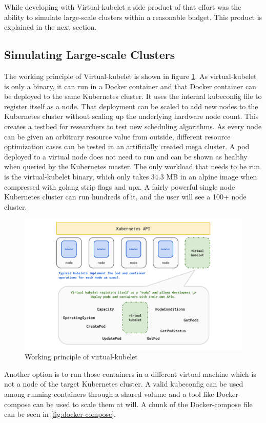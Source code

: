 While developing with Virtual-kubelet a side product of that effort was the ability to simulate large-scale clusters within a reasonable budget. This product is explained in the next section.
\subsection{Simulating Large-scale Clusters}
The working principle of Virtual-kubelet is shown in figure \ref{fig:vk}. As virtual-kubelet is only a binary, it can run in a Docker container and that Docker container can be deployed to the same Kubernetes cluster. It uses the internal kubeconfig file to register itself as a node. That deployment can be scaled to add new nodes to the Kubernetes cluster without scaling up the underlying hardware node count. This creates a testbed for researchers to test new scheduling algorithms. As every node can be given an arbitrary resource value from outside, different resource optimization cases can be tested in an artificially created mega cluster. A pod deployed to a virtual node does not need to run and can be shown as healthy when queried by the Kubernetes master. The only workload that needs to be run is the virtual-kubelet binary, which only takes 34.3 MB in an alpine image when compressed with golang strip flags and upx. A fairly powerful single node Kubernetes cluster can run hundreds of it, and the user will see a 100+ node cluster.

\begin{figure}[htpb]
  \centering
  \includegraphics[width=1\textwidth]{figures/diagram.pdf}
  \caption{Working principle of virtual-kubelet \cite{virtual}} \label{fig:vk}
\end{figure}

Another option is to run those containers in a different virtual machine which is not a node of the target Kubernetes cluster. A valid kubeconfig can be used among running containers through a shared volume and a tool like Docker-compose can be used to scale them at will. A chunk of the Docker-compose file can be seen in \ref{fig:docker-compose}.

